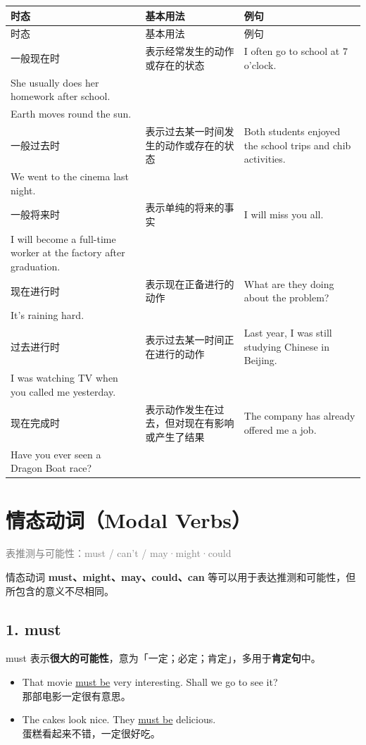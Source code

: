 \documentclass[11pt,a4paper]{ctexart}
\begin{document}
{\footnotesize
\begin{longtable}{p{4.47cm}p{4.47cm}p{4.47cm}}
\hline
时态 & 基本用法 & 例句 \\
\hline
\endfirsthead
\hline
时态 & 基本用法 & 例句 \\
\hline
\endhead
\hline
\endfoot
一般现在时 & 表示经常发生的动作或存在的状态 & I often go to school at 7 o’clock.\\ She usually does her homework after school.\\ Earth moves round the sun. \\
一般过去时 & 表示过去某一时间发生的动作或存在的状态 & Both students enjoyed the school trips and chib activities.\\ We went to the cinema last night. \\
一般将来时 & 表示单纯的将来的事实 & I will miss you all.\\ I will become a full-time worker at the factory after graduation. \\
现在进行时 & 表示现在正备进行的动作 & What are they doing about the problem?\\ It’s raining hard. \\
过去进行时 & 表示过去某一时间正在进行的动作 & Last year, I was still studying Chinese in Beijing.\\ I was watching TV when you called me yesterday. \\
现在完成时 & 表示动作发生在过去，但对现在有影响或产生了结果 & The company has already offered me a job.\\ Have you ever seen a Dragon Boat race? \\
\end{longtable}
}

\section{情态动词（Modal Verbs）}
\noindent\textcolor{gray}{表推测与可能性：must / can’t / may·might·could}\par\smallskip
情态动词 \textbf{must、might、may、could、can} 等可以用于表达推测和可能性，但所包含的意义不尽相同。

\subsection*{1. must}

must 表示\textbf{很大的可能性}，意为「一定；必定；肯定」，多用于\textbf{肯定句}中。

\begin{itemize}[leftmargin=1.4em]
\item That movie \underline{must be} very interesting. Shall we go to see it?\\ 那部电影一定很有意思。
\item The cakes look nice. They \underline{must be} delicious.\\ 蛋糕看起来不错，一定很好吃。
\end{itemize}
\end{document}
